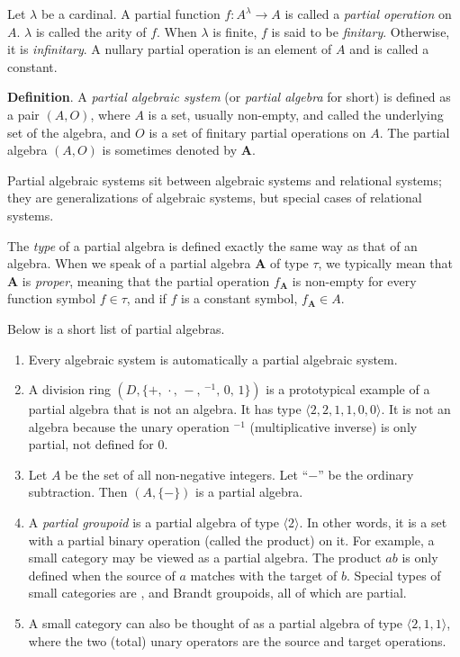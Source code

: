 \documentclass[12pt]{article}
\begin{document}
Let $\lambda$ be a cardinal.  A partial function $f: A^{\lambda} \to A$ is called a \emph{partial operation} on $A$.  $\lambda$ is called the arity of $f$.  When $\lambda$ is finite, $f$ is said to be \emph{finitary}.  Otherwise, it is \emph{infinitary}.  A nullary partial operation is an element of $A$ and is called a constant.

\textbf{Definition}.  A \emph{partial algebraic system} (or \emph{partial algebra} for short) is defined as a pair $(A,O)$, where $A$ is a set, usually non-empty, and called the underlying set of the algebra, and $O$ is a set of finitary partial operations on $A$.  The partial algebra $(A,O)$ is sometimes denoted by $\boldsymbol{A}$.

Partial algebraic systems sit between algebraic systems and relational systems; they are generalizations of algebraic systems, but special cases of relational systems.

The \emph{type} of a partial algebra is defined exactly the same way as that of an algebra.  When we speak of a partial algebra $\boldsymbol{A}$ of type $\tau$, we typically mean that $\boldsymbol{A}$ is \emph{proper}, meaning that the partial operation $f_{\boldsymbol{A}}$ is non-empty for every function symbol $f\in \tau$, and if $f$ is a constant symbol, $f_{\boldsymbol{A}} \in A$.

Below is a short list of partial algebras.
\begin{enumerate}
\item
Every algebraic system is automatically a partial algebraic system.
\item
A division ring $(D,\lbrace +\mbox{, }\cdot\mbox{, }-\mbox{, }^{-1}\mbox{, }0\mbox{, }1\rbrace)$ is a prototypical example of a partial algebra that is not an algebra.  It has type $\langle 2,2,1,1,0,0\rangle$.  It is not an algebra because the unary operation $^{-1}$ (multiplicative inverse) is only partial, not defined for $0$.
\item
Let $A$ be the set of all non-negative integers.  Let ``$-$'' be the ordinary subtraction.  Then $(A,\lbrace -\rbrace)$ is a partial algebra.
\item
A \emph{partial groupoid} is a partial algebra of type $\langle 2\rangle$.  In other words, it is a set with a partial binary operation (called the product) on it.  For example, a small category may be viewed as a partial algebra.  The product $ab$ is only defined when the source of $a$ matches with the target of $b$.  Special types of small categories are , and Brandt groupoids, all of which are partial.
\item
A small category can also be thought of as a partial algebra of type $\langle 2,1,1\rangle$, where the two (total) unary operators are the source and target operations.
\end{enumerate}
\end{document}
